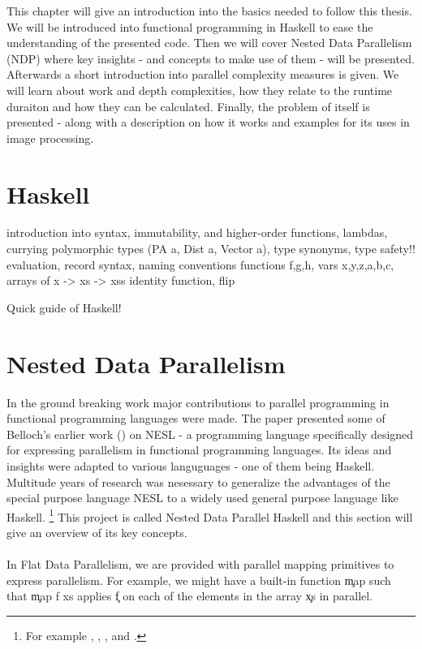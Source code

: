 

This chapter will give an introduction into the basics needed to
follow this thesis. We will be introduced into functional programming
in Haskell to ease the understanding of the presented code.
Then we will cover Nested Data Parallelism (NDP) where
key insights - and concepts to make use of them - will be presented.
Afterwards a short introduction into parallel complexity measures is given.
We will learn about work and depth complexities, how they relate
to the runtime duraiton and how they can be calculated.
Finally, the problem of \algo itself is presented - along with
a description on how it works and examples for its uses in image processing.

\section{Haskell}
  introduction into syntax, immutability, and higher-order functions, lambdas, currying
  polymorphic types (PA a, Dist a, Vector a), type synonyms,
  type safety!!
  evaluation, record syntax, naming conventions functions f,g,h, vars x,y,z,a,b,c, arrays of x -> xs -> xss
  identity function, flip
  
  Quick guide of Haskell!


\section{Nested Data Parallelism}
  In the ground breaking work \cite{Belloch1996}
  major contributions to parallel programming in
  functional programming languages were made.
  The paper presented some of Belloch's earlier work (\cite{NepaBelloch1993}) on NESL
  - a programming language specifically designed for expressing parallelism
  in functional programming languages. Its ideas and insights were
  adapted to various languguages - one of them being Haskell.
  Multitude years of research was nesessary to generalize the
  advantages of the special purpose language NESL to a widely used
  general purpose language like Haskell.
  \footnote{For example \cite{Harness2008}, \cite{DPHStatus2007},
  \cite{EffiVect2012Lipp}, \cite{HighOrdFlat2006} and \cite{DistTypes1999}.}
  This project is called Nested Data Parallel Haskell and this section will give
  an overview of its key concepts.  
  
  \paragraph{}
    In Flat Data Parallelism, we are provided with parallel mapping primitives
    to express parallelism. For example, we might have a built-in
    function \c{map} such that \c{map f xs} applies \c{f}
    on each of the elements in the array \c{xs} in parallel.
    
